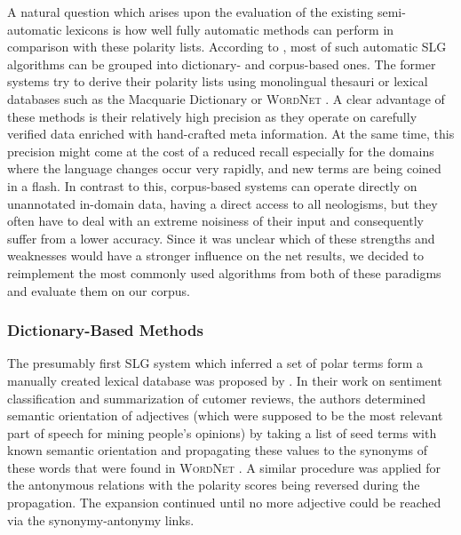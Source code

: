 A natural question which arises upon the evaluation of the existing
semi-automatic lexicons is how well fully automatic methods can
perform in comparison with these polarity lists.  According to
\citet[p. 79]{Liu:12}, most of such automatic SLG algorithms can be
grouped into dictionary- and corpus-based ones.  The former systems
try to derive their polarity lists using monolingual thesauri or
lexical databases such as the Macquarie Dictionary \cite{Bernard:86}
or \textsc{WordNet} \cite{Miller:95}.  A clear advantage of these
methods is their relatively high precision as they operate on
carefully verified data enriched with hand-crafted meta information.
At the same time, this precision might come at the cost of a reduced
recall especially for the domains where the language changes occur
very rapidly, and new terms are being coined in a flash.  In contrast
to this, corpus-based systems can operate directly on unannotated
in-domain data, having a direct access to all neologisms, but they
often have to deal with an extreme noisiness of their input and
consequently suffer from a lower accuracy.  Since it was unclear which
of these strengths and weaknesses would have a stronger influence on
the net results, we decided to reimplement the most commonly used
algorithms from both of these paradigms and evaluate them on our
corpus.

\subsubsection{Dictionary-Based Methods}

The presumably first SLG system which inferred a set of polar terms
form a manually created lexical database was proposed by
\citet{Hu:04}.  In their work on sentiment classification and
summarization of cutomer reviews, the authors determined semantic
orientation of adjectives (which were supposed to be the most relevant
part of speech for mining people's opinions) by taking a list of seed
terms with known semantic orientation and propagating these values to
the synonyms of these words that were found in \textsc{WordNet}
\cite{Miller:95}.  A similar procedure was applied for the antonymous
relations with the polarity scores being reversed during the
propagation.  The expansion continued until no more adjective could be
reached via the synonymy-antonymy links.

